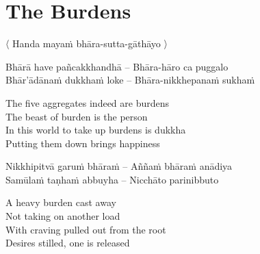 \suttaRef{[Dhp 85-87.5]}


\section{The Burdens}
\label{burdens}

\begin{leader}
  〈 Handa mayaṁ bhāra-sutta-gāthāyo 〉

\end{leader}

\begin{twochants}
  Bhārā have pañcakkhandhā – Bhāra-hāro ca puggalo \\
  Bhār'ādānaṁ dukkhaṁ loke – Bhāra-nikkhepanaṁ sukhaṁ \\
\end{twochants}

\begin{english-verses}
  The five aggregates indeed are burdens\\
  The beast of burden is the person\\
  In this world to take up burdens is dukkha\\
  Putting them down brings happiness
\end{english-verses}

\begin{twochants}
  Nikkhipitvā garuṁ bhāraṁ – Aññaṁ bhāraṁ anādiya\\
  Samūlaṁ taṇhaṁ abbuyha – Nicchāto parinibbuto\\
\end{twochants}

\begin{english-verses}
  A heavy burden cast away\\
  Not taking on another load\\
  With craving pulled out from the root\\
  Desires stilled, one is released
\end{english-verses}

\suttaRef{[SN 22.22]}


